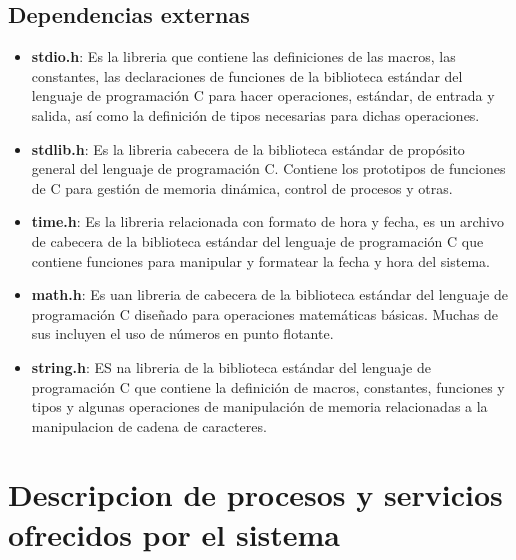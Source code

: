 \documentclass[12pt,twocolum,a4paper]{article}
\begin{document}
\subsection{Dependencias externas}
\begin{itemize}
    \item {\bf stdio.h}: Es la libreria que contiene las definiciones de las macros, las constantes, las declaraciones de funciones de la biblioteca estándar del lenguaje de programación C para hacer operaciones, estándar, de entrada y salida, así como la definición de tipos necesarias para dichas operaciones.
    \item {\bf stdlib.h}: Es la libreria cabecera de la biblioteca estándar de propósito general del lenguaje de programación C. Contiene los prototipos de funciones de C para gestión de memoria dinámica, control de procesos y otras.
    \item {\bf time.h}: Es la libreria relacionada con formato de hora y fecha, es un archivo de cabecera de la biblioteca estándar del lenguaje de programación C que contiene funciones para manipular y formatear la fecha y hora del sistema.
    \item {\bf math.h}: Es uan libreria de cabecera de la biblioteca estándar del lenguaje de programación C diseñado para operaciones matemáticas básicas. Muchas de sus incluyen el uso de números en punto flotante.
    \item {\bf string.h}: ES na libreria de la biblioteca estándar del lenguaje de programación C que contiene la definición de macros, constantes, funciones y tipos y algunas operaciones de manipulación de memoria relacionadas a la manipulacion de cadena de caracteres.
\end{itemize}

\section{Descripcion de procesos y servicios \newline ofrecidos por el sistema}
\end{document}

